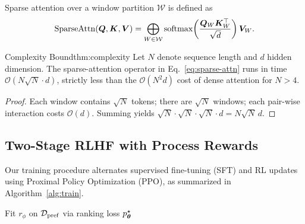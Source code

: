 Sparse attention over a window partition $\mathcal{W}$ is defined as
\begin{equation}
    \mathrm{SparseAttn}(\bm{Q},\bm{K},\bm{V})
      = \bigoplus_{W\in\mathcal{W}}\operatorname{softmax}\!\left(\frac{\bm{Q}_W \bm{K}_W^\top}{\sqrt{d}}\right)\bm{V}_W.
    \label{eq:sparse-attn}
\end{equation}

\begin{theorem}{Complexity Bound}{thm:complexity}
Let $N$ denote sequence length and $d$ hidden dimension. The sparse-attention
operator in Eq.~\eqref{eq:sparse-attn} runs in time
$\mathcal{O}(N\sqrt{N}\cdot d)$, strictly less than the $\mathcal{O}(N^2 d)$
cost of dense attention for $N > 4$.
\end{theorem}

\begin{proof}
Each window contains $\sqrt{N}$ tokens; there are $\sqrt{N}$ windows; each
pair-wise interaction costs $\mathcal{O}(d)$. Summing yields
$\sqrt{N}\cdot\sqrt{N}\cdot\sqrt{N}\cdot d = N\sqrt{N}\,d$.
\end{proof}

\subsection{Two-Stage RLHF with Process Rewards}
\label{sec:method-rlhf}

Our training procedure alternates supervised fine-tuning (SFT) and RL updates
using Proximal Policy Optimization (PPO), as summarized in
Algorithm~\ref{alg:train}.

\begin{algorithm}[t]
\DontPrintSemicolon
\caption{Two-Stage RLHF Training for BJTU-LLM}
\label{alg:train}
Fit $r_\phi$ on $\mathcal{D}_{\mathrm{pref}}$ via ranking loss\;
\Return $p_{\bm{\theta}}^{\star}$\;
\end{algorithm}
